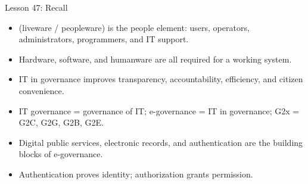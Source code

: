 \documentclass[aspectratio=169]{beamer}
\begin{document}
\begin{frame}{Lesson 47: Recall}
  \begin{itemize}
    \item {} (liveware / peopleware) is the people element:
      users, operators, administrators, programmers, and IT support.
    \item Hardware, software, and humanware are all required for a working
      system.
    \item IT in governance improves transparency, accountability,
      efficiency, and citizen convenience.
    \item IT governance = governance of IT; e-governance = IT in governance;
      G2x = G2C, G2G, G2B, G2E.
    \item Digital public services, electronic records, and authentication are
      the building blocks of e-governance.
    \item Authentication proves identity; authorization grants permission.
  \end{itemize}
\end{frame}
\end{document}
